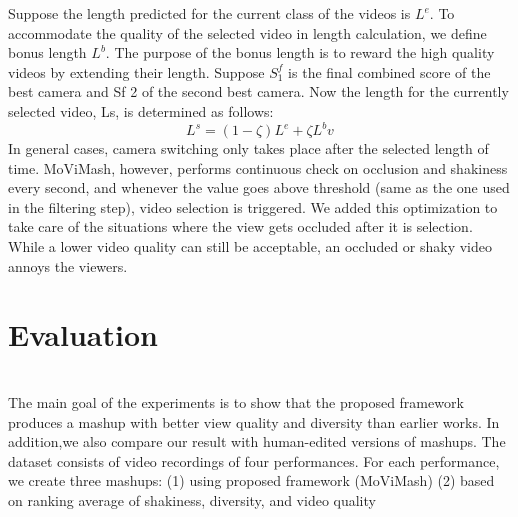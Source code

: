 \documentclass{sig-alternate}
\providecommand{\DIFadd}[1]{{\protect\color{blue}\uwave{#1}}} %
\providecommand{\DIFaddbegin}{} %
\providecommand{\DIFaddend}{} %
\newcommand{\DIFaddincludegraphics}[2][]{{\color{blue}\fbox{\DIFOincludegraphics[#1]{#2}}}} %
\DeclareRobustCommand{\DIFaddbegin}{\DIFOaddbegin \let\includegraphics\DIFaddincludegraphics} %
\DeclareRobustCommand{\DIFaddend}{\DIFOaddend \let\includegraphics\DIFOincludegraphics} %
\begin{document}
Suppose the length predicted for the current class of the videos is \(L^e\). To accommodate the quality of the selected video in length calculation, we deﬁne bonus length \(L^b\). The purpose of the bonus length is to reward the high quality videos by extending their length. Suppose \(S^f_1\) is the ﬁnal combined score of the best camera and Sf 2 of the second best camera. Now the length for the currently selected video, Ls, is determined as follows:
\begin{equation}
L^s = (1- \zeta)L^e + \zeta L^bv
\end{equation}
In general cases, camera switching only takes place after the selected length of time. MoViMash, however, performs continuous check on occlusion and shakiness every second, and whenever the value goes above threshold (same as the one used in the ﬁltering step), video selection is triggered. We added this optimization to take care of the situations where the view gets occluded after it is selection. While a lower video quality can still be acceptable, an occluded or shaky video annoys the viewers.

\section{Evaluation}
\DIFaddbegin \DIFadd{Did you see the changes?}\\
\DIFaddend The main goal of the experiments is to show that the proposed framework produces a mashup with better view quality and diversity than earlier works. In addition,we also compare our result with human-edited versions of mashups. The dataset consists of video recordings of four performances. For each performance, we create three mashups: (1) using proposed framework (MoViMash) (2) based on ranking average of shakiness, diversity, and video quality\\ \\ \\
\end{document}
